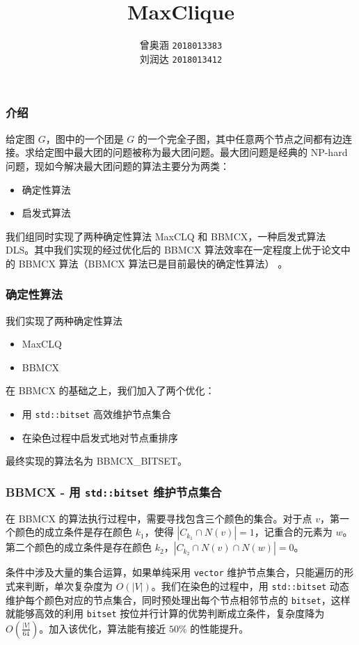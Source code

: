 \documentclass[slidestop,compress,mathserif]{beamer}
\title{MaxClique}
\author{曾奥涵 \texttt{2018013383}\\刘润达 \texttt{2018013412}}
\begin{document}
	\setlength{\baselineskip}{20pt}
	\begin{frame}
		\titlepage
	\end{frame}
	
	\begin{frame}
		\frametitle {介绍}
		给定图 $G$，图中的一个团是 $G$ 的一个完全子图，其中任意两个节点之间都有边连接。求给定图中最大团的问题被称为最大团问题。最大团问题是经典的 NP-hard 问题，现如今解决最大团问题的算法主要分为两类：
		
		\begin{itemize}
			\item 确定性算法
			\item 启发式算法
		\end{itemize}		
		
		我们组同时实现了两种确定性算法 MaxCLQ 和 BBMCX，一种启发式算法 DLS。其中我们实现的经过优化后的 BBMCX 算法效率在一定程度上优于论文中的 BBMCX 算法（BBMCX 算法已是目前最快的确定性算法） 。
	
	\end{frame}
	
	\begin{frame}
		\frametitle {确定性算法}
			我们实现了两种确定性算法	
			\begin{itemize}
				\item MaxCLQ
				\item BBMCX
			\end{itemize}
			
			在 BBMCX 的基础之上，我们加入了两个优化：
			
			\begin{itemize}
				\item 用 \texttt{std::bitset} 高效维护节点集合
				\item 在染色过程中启发式地对节点重排序
			\end{itemize}
			
			最终实现的算法名为 BBMCX\_BITSET。

	\end{frame}
		
	\begin{frame}
		\frametitle {BBMCX - 用 \texttt{std::bitset} 维护节点集合}
	 	在 BBMCX 的算法执行过程中，需要寻找包含三个颜色的集合。对于点 $v$，第一个颜色的成立条件是存在颜色 $k_1$，使得 $|C_{k_1} \cap N(v)| = 1$，记重合的元素为 $w$。第二个颜色的成立条件是存在颜色 $k_2$，$|C_{k_2} \cap N(v) \cap N(w)| = 0$。
	
	条件中涉及大量的集合运算，如果单纯采用 \texttt{vector} 维护节点集合，只能遍历的形式来判断，单次复杂度为 $O(|V|)$。我们在染色的过程中，用 \texttt{std::bitset} 动态维护每个颜色对应的节点集合，同时预处理出每个节点相邻节点的 \texttt{bitset}，这样就能够高效的利用 \texttt{bitset} 按位并行计算的优势判断成立条件，复杂度降为 $O(\frac {|V|} {64})$。加入该优化，算法能有接近 $50\%$ 的性能提升。
	\end{frame}
	
\end{document}
